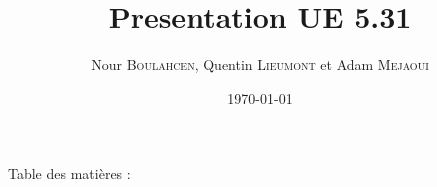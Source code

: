 \documentclass{beamer}
\title{Presentation UE 5.31}
\author{
    Nour \textsc{Boulahcen},
    Quentin \textsc{Lieumont} et
    Adam \textsc{Mejaoui}
}
\institute{Institut Villebon Georges \textsc{Charpak}}
\date{\today}
\begin{document}
\begin{frame}
    \titlepage
\end{frame}

\begin{frame}{Table des matières :}
    \tableofcontents
\end{frame}
\end{document}
